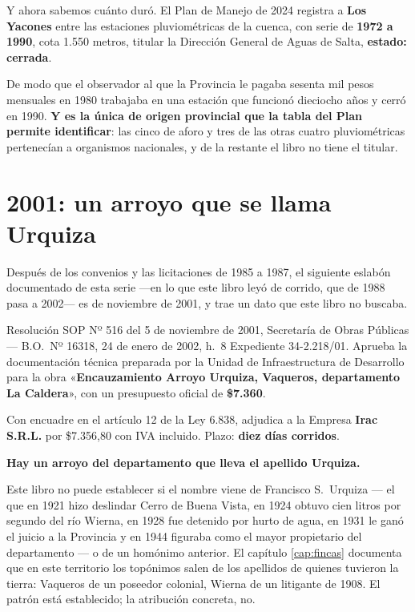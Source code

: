 Y ahora sabemos cuánto duró. El Plan de Manejo de 2024 registra a \textbf{Los Yacones}
entre las estaciones pluviométricas de la cuenca, con serie de \textbf{1972 a 1990}, cota
1.550 metros, titular la Dirección General de Aguas de Salta, \textbf{estado: cerrada}.

De modo que el observador al que la Provincia le pagaba sesenta mil pesos mensuales en 1980
trabajaba en una estación que funcionó dieciocho años y cerró en 1990. \textbf{Y es la
única de origen provincial que la tabla del Plan permite identificar}: las cinco de aforo y tres de las otras cuatro pluviométricas pertenecían a organismos nacionales, y de la restante el libro no tiene el titular.

\section{2001: un arroyo que se llama Urquiza}

Después de los convenios y las licitaciones de 1985 a 1987, el siguiente eslabón documentado de esta serie ---en lo que este libro leyó de corrido, que de 1988 pasa a 2002--- es de noviembre de
2001, y trae un dato que este libro no buscaba.

\begin{ficha}{Resolución SOP Nº 516 del 5 de noviembre de 2001, Secretaría de Obras Públicas --- B.O.\ Nº 16318, 24 de enero de 2002, h.\ 8}
Expediente 34-2.218/01. Aprueba la documentación técnica preparada por la Unidad de
Infraestructura de Desarrollo para la obra «\textbf{Encauzamiento Arroyo Urquiza, Vaqueros,
departamento La Caldera}», con un presupuesto oficial de \textbf{\$7.360}.

Con encuadre en el artículo 12 de la Ley 6.838, adjudica a la Empresa \textbf{Irac S.R.L.}
por \$7.356,80 con IVA incluido. Plazo: \textbf{diez días corridos}.
\end{ficha}

\textbf{Hay un arroyo del departamento que lleva el apellido Urquiza.}

Este libro no puede establecer si el nombre viene de Francisco S.\ Urquiza --- el que en 1921
hizo deslindar Cerro de Buena Vista, en 1924 obtuvo cien litros por segundo del río Wierna,
en 1928 fue detenido por hurto de agua, en 1931 le ganó el juicio a la Provincia y en 1944
figuraba como el mayor propietario del departamento --- o de un homónimo anterior. El
capítulo \ref{cap:fincas} documenta que en este territorio los topónimos salen de los apellidos de quienes
tuvieron la tierra: Vaqueros de un poseedor colonial, Wierna de un litigante de 1908. El
patrón está establecido; la atribución concreta, no.

